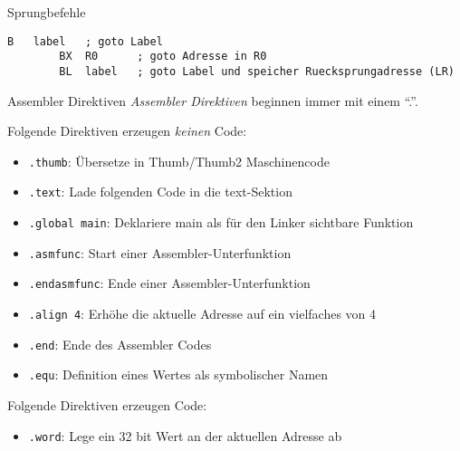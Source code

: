 \begin{defi}{Sprungbefehle}
    \begin{lstlisting}[language={[x86masm]Assembler}]
        B   label   ; goto Label
        BX  R0      ; goto Adresse in R0
        BL  label   ; goto Label und speicher Ruecksprungadresse (LR)
    \end{lstlisting}
\end{defi}

\begin{bonus}{Assembler Direktiven}
    \emph{Assembler Direktiven} beginnen immer mit einem \enquote{.}.

    Folgende Direktiven erzeugen \emph{keinen} Code:
    \begin{itemize}
        \item \texttt{.thumb}: Übersetze in Thumb/Thumb2 Maschinencode
        \item \texttt{.text}: Lade folgenden Code in die text-Sektion
        \item \texttt{.global main}: Deklariere main als für den Linker sichtbare Funktion
        \item \texttt{.asmfunc}: Start einer Assembler-Unterfunktion
        \item \texttt{.endasmfunc}: Ende einer Assembler-Unterfunktion
        \item \texttt{.align 4}: Erhöhe die aktuelle Adresse auf ein vielfaches von 4
        \item \texttt{.end}: Ende des Assembler Codes
        \item \texttt{.equ}: Definition eines Wertes als symbolischer Namen
    \end{itemize}

    Folgende Direktiven erzeugen Code:
    \begin{itemize}
        \item \texttt{.word}: Lege ein 32 bit Wert an der aktuellen Adresse ab
    \end{itemize}
\end{bonus}

